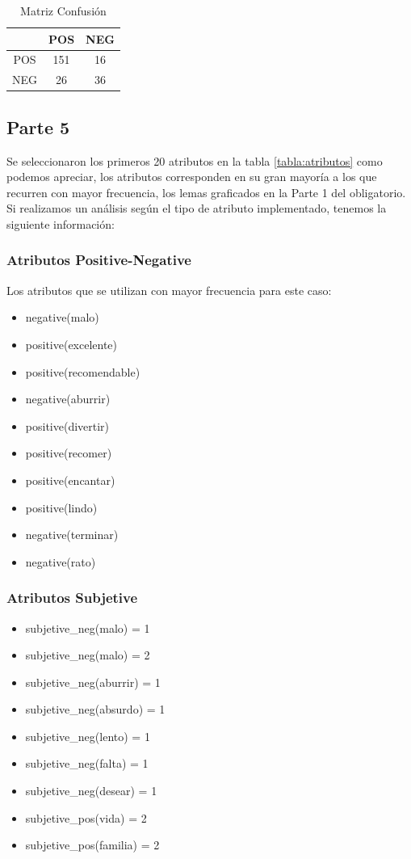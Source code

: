 \documentclass[12pt]{article}
\begin{document}
\begin{table}[!htb]
\begin{center}
\begin{tabular}{|c|c|c|} 
\cline{2-3}
 \multicolumn{1}{l}{}&
 \multicolumn{1}{|l}{POS}&
 \multicolumn{1}{|l|}{NEG}
\tabularnewline
  \hline
  POS & 151 & 16 \\ \hline
  NEG & 26 & 36 \\ \hline
\end{tabular} 
\end{center}
\caption{Matriz Confusión} 
\label{tabla:matrix}
\end{table}

\subsection{Parte 5}
Se seleccionaron los primeros 20 atributos en la tabla \ref{tabla:atributos} como podemos apreciar, los atributos corresponden en su gran mayoría a los que recurren con mayor frecuencia, los lemas graficados en la Parte 1 del obligatorio. Si realizamos un análisis según el tipo de atributo implementado, tenemos la siguiente información:
\subsubsection{Atributos Positive-Negative}
Los atributos que se utilizan con mayor frecuencia para este caso:
\begin{itemize}
  \item negative(malo)
  \item positive(excelente)
  \item positive(recomendable)
  \item negative(aburrir)
  \item positive(divertir)
  \item positive(recomer)
  \item positive(encantar)
  \item positive(lindo)
  \item negative(terminar)
  \item negative(rato)
\end{itemize}

\subsubsection{Atributos Subjetive}
\begin{itemize}
  \item subjetive\_neg(malo) = 1
  \item subjetive\_neg(malo) = 2
  \item subjetive\_neg(aburrir) = 1
  \item subjetive\_neg(absurdo) = 1
  \item subjetive\_neg(lento) = 1
  \item subjetive\_neg(falta) = 1
  \item subjetive\_neg(desear) = 1
  \item subjetive\_pos(vida) = 2
  \item subjetive\_pos(familia) = 2
\end{itemize}
\end{document}
